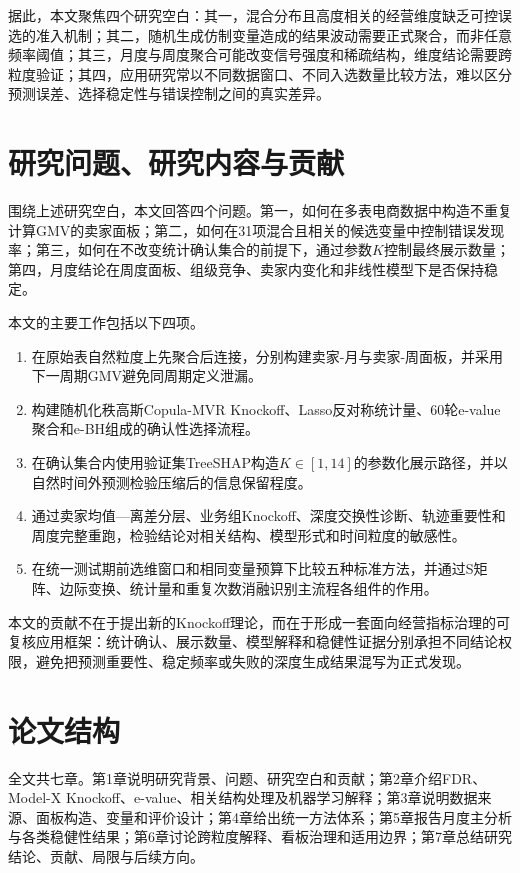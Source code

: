 \documentclass{sufethesismas}
\providecommand{\tightlist}{\setlength{\itemsep}{0pt}\setlength{\parskip}{0pt}}
\begin{document}
据此，本文聚焦四个研究空白：其一，混合分布且高度相关的经营维度缺乏可控误选的准入机制；其二，随机生成仿制变量造成的结果波动需要正式聚合，而非任意频率阈值；其三，月度与周度聚合可能改变信号强度和稀疏结构，维度结论需要跨粒度验证；其四，应用研究常以不同数据窗口、不同入选数量比较方法，难以区分预测误差、选择稳定性与错误控制之间的真实差异。

\section{研究问题、研究内容与贡献}

围绕上述研究空白，本文回答四个问题。第一，如何在多表电商数据中构造不重复计算GMV的卖家面板；第二，如何在31项混合且相关的候选变量中控制错误发现率；第三，如何在不改变统计确认集合的前提下，通过参数\(K\)控制最终展示数量；第四，月度结论在周度面板、组级竞争、卖家内变化和非线性模型下是否保持稳定。

本文的主要工作包括以下四项。

\begin{enumerate}
\def\labelenumi{\arabic{enumi}.}
\tightlist
\item
  在原始表自然粒度上先聚合后连接，分别构建卖家-月与卖家-周面板，并采用下一周期GMV避免同周期定义泄漏。
\item
  构建随机化秩高斯Copula-MVR Knockoff、Lasso反对称统计量、60轮e-value聚合和e-BH组成的确认性选择流程。
\item
  在确认集合内使用验证集TreeSHAP构造\(K\in[1,14]\)的参数化展示路径，并以自然时间外预测检验压缩后的信息保留程度。
\item
  通过卖家均值---离差分层、业务组Knockoff、深度交换性诊断、轨迹重要性和周度完整重跑，检验结论对相关结构、模型形式和时间粒度的敏感性。
\item
  在统一测试期前选维窗口和相同变量预算下比较五种标准方法，并通过S矩阵、边际变换、统计量和重复次数消融识别主流程各组件的作用。
\end{enumerate}

本文的贡献不在于提出新的Knockoff理论，而在于形成一套面向经营指标治理的可复核应用框架：统计确认、展示数量、模型解释和稳健性证据分别承担不同结论权限，避免把预测重要性、稳定频率或失败的深度生成结果混写为正式发现。

\section{论文结构}

全文共七章。第1章说明研究背景、问题、研究空白和贡献；第2章介绍FDR、Model-X Knockoff、e-value、相关结构处理及机器学习解释；第3章说明数据来源、面板构造、变量和评价设计；第4章给出统一方法体系；第5章报告月度主分析与各类稳健性结果；第6章讨论跨粒度解释、看板治理和适用边界；第7章总结研究结论、贡献、局限与后续方向。
\end{document}
